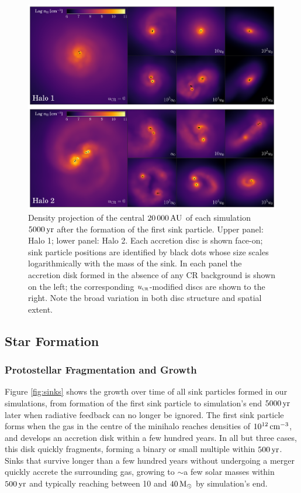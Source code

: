 \documentclass[../thesis.tex]{subfiles}
\begin{document}
\begin{figure}
\begin{center}
\includegraphics[width=\columnwidth]{figures/disks/disks}
\caption{\label{fig:disks} 
Density projection of the central $20\,000\,\mathrm{AU}$ of each simulation $5000\,\mathrm{yr}$ after the formation of the first sink particle.
Upper panel: Halo 1; lower panel: Halo 2.
Each accretion disc is shown face-on; sink particle positions are identified by black dots whose size scales logarithmically with the mass of the sink.
In each panel the accretion disk formed in the absence of any CR background is shown on the left; the corresponding ${u}_{\textsc{cr}}$-modified discs are shown to the right.
Note the broad variation in both disc structure and spatial extent.%
}
\end{center}
\end{figure}

\subsection{Star Formation}
\subsubsection{Protostellar Fragmentation and Growth}
\label{sec:sink_formation}

Figure \ref{fig:sinks} shows the growth over time of all sink particles formed in our simulations, from formation of the first sink particle to simulation's end $5000\,\mathrm{yr}$ later when radiative feedback can no longer be ignored. 
The first sink particle forms when the gas in the centre of the minihalo reaches densities of $10^{12}\,\mathrm{cm}^{-3}$, and develops an accretion disk within a few hundred years. 
In all but three cases, this disk quickly fragments, forming a binary or small multiple within $500\,\mathrm{yr}$. 
Sinks that survive longer than a few hundred years without undergoing a merger quickly accrete the surrounding gas, growing to $\sim$a few solar masses within $500\,\mathrm{yr}$ and typically reaching between 10 and $40\,\mathrm{M}_{\odot}$ by simulation's end.
\end{document}
